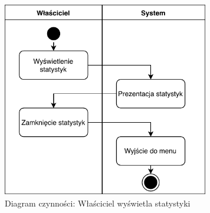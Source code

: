 \begin{figure}[H]
	\centering
	\includegraphics[width=90mm]{diagramy/DiagCzynStatystyki.pdf}
	\caption{Diagram czynności: Właściciel wyświetla statystyki}
\end{figure}




